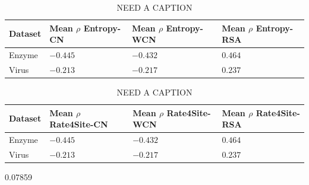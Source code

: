 \documentclass[12pt]{article}
\begin{document}
\begin{center}
	\begin{table}[H]
	\begin{tabular}{| p{1.5cm} | p{2.5cm} | p{2cm} | p{2cm} | }
		\hline
		Dataset & Mean $\rho$ Entropy-CN  & Mean $\rho$ Entropy-WCN & Mean $\rho$ Entropy-RSA \\
		\hline	
		Enzyme &  $-0.445$  & $-0.432$ & $0.464$ \\
		\hline
		Virus & $-0.213$ & $-0.217$ & $0.237$ \\
		\hline	
	\end{tabular}
	\caption{NEED A CAPTION}
	\label{table:entropy_stats}
	\end{table}
\end{center}

\begin{center}
	\begin{table}[H]
	\begin{tabular}{| p{1.5cm} | p{2.5cm} | p{2cm} | p{2cm} |  }
		\hline
		Dataset & Mean $\rho$ Rate4Site-CN  & Mean $\rho$ Rate4Site-WCN & Mean $\rho$ Rate4Site-RSA \\
		\hline	
		Enzyme &  $-0.445$  & $-0.432$ & $0.464$ \\
		\hline
		Virus & $-0.213$ & $-0.217$ & $0.237$ \\
		\hline	
	\end{tabular}
	\caption{NEED A CAPTION}0.07859
	\label{table:entropy_stats}
	\end{table}
\end{center}
\end{document}
